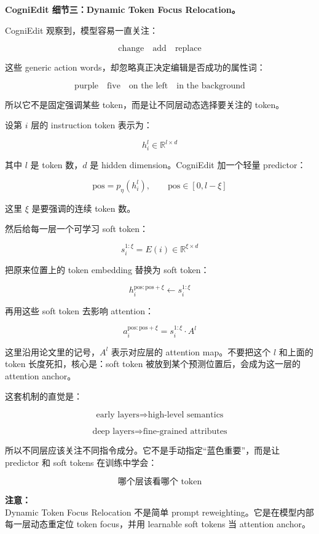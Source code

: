 \textbf{CogniEdit 细节三：Dynamic Token Focus Relocation。}

CogniEdit 观察到，模型容易一直关注：

\[
\text{change}
\quad
\text{add}
\quad
\text{replace}
\]

这些 generic action words，却忽略真正决定编辑是否成功的属性词：

\[
\text{purple}
\quad
\text{five}
\quad
\text{on the left}
\quad
\text{in the background}
\]

所以它不是固定强调某些 token，而是让不同层动态选择要关注的 token。

设第 $i$ 层的 instruction token 表示为：

\[
h_i^l
\in
\mathbb{R}^{l\times d}
\]

其中 $l$ 是 token 数，$d$ 是 hidden dimension。CogniEdit 加一个轻量 predictor：

\[
\text{pos}
=
p_\eta(h_i^l),
\qquad
\text{pos}\in[0,l-\xi]
\]

这里 $\xi$ 是要强调的连续 token 数。

然后给每一层一个可学习 soft token：

\[
s_i^{1:\xi}
=
E(i)
\in
\mathbb{R}^{\xi\times d}
\]

把原来位置上的 token embedding 替换为 soft token：

\[
h_i^{\text{pos}:\text{pos}+\xi}
\leftarrow
s_i^{1:\xi}
\]

再用这些 soft token 去影响 attention：

\[
a_i^{\text{pos}:\text{pos}+\xi}
=
s_i^{1:\xi}
\cdot
A^l
\]

这里沿用论文里的记号，$A^l$ 表示对应层的 attention map。不要把这个 $l$ 和上面的 token 长度死扣，核心是：soft token 被放到某个预测位置后，会成为这一层的 attention anchor。

这套机制的直觉是：

\[
\text{early layers}
\Rightarrow
\text{high-level semantics}
\]

\[
\text{deep layers}
\Rightarrow
\text{fine-grained attributes}
\]

所以不同层应该关注不同指令成分。它不是手动指定“蓝色重要”，而是让 predictor 和 soft tokens 在训练中学会：

\[
\text{哪个层该看哪个 token}
\]

\begin{warnbox}
\textbf{注意：}\\
Dynamic Token Focus Relocation 不是简单 prompt reweighting。它是在模型内部每一层动态重定位 token focus，并用 learnable soft tokens 当 attention anchor。
\end{warnbox}

